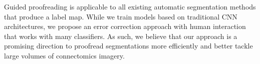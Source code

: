 Guided proofreading is applicable to all existing automatic segmentation methods that produce a label map.
While we train models based on traditional CNN architectures, we propose an error correction approach with human interaction that works with many classifiers.
As such, we believe that our approach is a promising direction to proofread segmentations more efficiently and better tackle large volumes of connectomics imagery.

%
%
